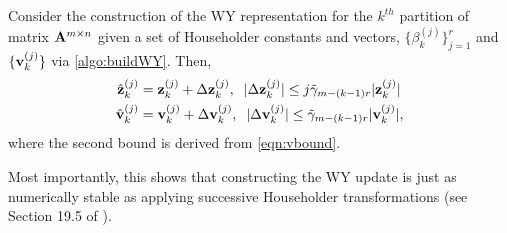\begin{lemma}\label{lem:BQR-build}
	Consider the construction of the WY representation for the $k^{th}$ partition of matrix $\mathbf{A}^{m\times n}$ given a set of Householder constants and vectors, $\{\beta_k^{(j)}\}_{j=1}^r$ and $\{\mathbf{v}_{k}^{(j)}\}$ via \cref{algo:buildWY}.
	Then, 
	\begin{align}
		\hat{\bb{z}}_{k}^{(j)}& = \bb{z}_{k}^{(j)} + \Delta \bb{z}_{k}^{(j)},\;\; |\Delta \bb{z}_{k}^{(j)}| \leq j\tilde{\gamma}_{m-(k-1)r} |\bb{z}_{k}^{(j)}|\label{eqn:BQR-z}\\
		\hat{\bb{v}}_{k}^{(j)}& = \bb{v}_{k}^{(j)} + \Delta \bb{v}_{k}^{(j)},\;\; |\Delta \bb{v}_{k}^{(j)}| \leq \tilde{\gamma}_{m-(k-1)r} |\bb{v}_{k}^{(j)}|\label{eqn:BQR-v},
	\end{align}
	where the second bound is derived from \cref{eqn:vbound}.
\end{lemma}
Most importantly, this shows that constructing the WY update is just as numerically stable as applying successive Householder transformations (see Section 19.5 of \cite{Higham2002}).

